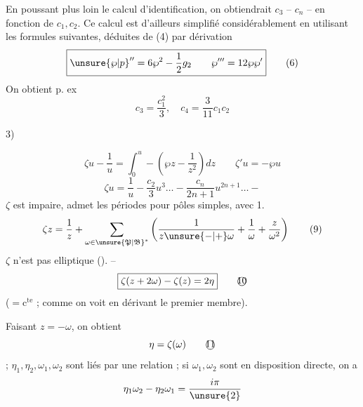 En poussant plus loin le calcul d'identification, on obtiendrait $c_3$ -- $c_n$ -- en fonction de $c_1,c_2$. Ce calcul est d'ailleurs simplifié considérablement en utilisant les formules suivantes, déduites de (4) par dérivation
\[
\boxed{\mathord{\unsure{\wp|p}}''=6\wp^2-\frac12g_2\qquad\wp'''=12\wp\wp'}\tag*{(6)}
\]
On obtient p. ex
\[
\boxed{c_3=\frac{c_1^2}3,\quad c_4=\frac3{11}c_1c_2}\tag*{(7)}
\]

\noindent{} 3) 

\[
\zeta u-\frac1u=\int_0^u-\left(\wp z-\frac1{z^2}\right)dz\qquad\zeta'u=-\wp u\tag*{(7)}
\]
\[
\zeta u=\frac1u-\frac{c_2}{3}u^3\ldots-\frac{c_n}{2n+1}u^{2n+1}\ldots-\tag*{(8)}
\]
$\zeta$ est impaire, admet les périodes pour pôles simples, avec   1.
\[
\zeta z=\frac1z+\sum_{\omega\in{\unsure{\mathfrak P|\mathfrak B}}^{*}}\left(\frac1{z\unsure{-|+}\omega}+\frac1{\omega}+\frac{z}{\omega^2}\right)\tag*{(9)}
\]
$\zeta$ n'est pas elliptique (). --
\[
\boxed{\zeta(z+2\omega)-\zeta(z)=2\eta}\tag*{\textcircled{10}}
\]
($=\mathrm c^{\mathrm{te}}$ ; comme on voit en dérivant le premier membre).

Faisant $z=-\omega$, on obtient
\[
\eta=\zeta(\omega)\tag*{\textcircled{11}}
\]
; $\eta_1,\eta_2,\omega_1,\omega_2$ sont liés par une relation ; si $\omega_1,\omega_2$ sont en disposition directe, on a
\[
\eta_1\omega_2-\eta_2\omega_1=\frac{i\pi}{\unsure{2}}
\]

